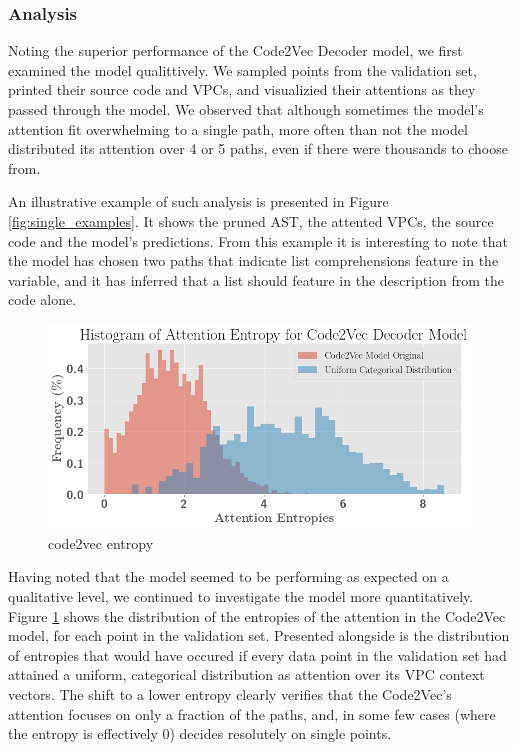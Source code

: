 \subsubsection{Analysis} %
\label{ssub:analysis}
Noting the superior performance of the Code2Vec Decoder model, we first examined the model qualittively. We sampled points from the validation set, printed their source code and VPCs, and visualizied their attentions as they passed through the model.
We observed that although sometimes the model's attention fit overwhelming to a single path, more often than not the model distributed its attention over 4 or 5 paths, even if there were thousands to choose from.

An illustrative example of such analysis is presented in Figure  \ref{fig:single_examples}. 
It shows the pruned AST, the attented VPCs, the source code and the model's predictions.
From this example it is interesting to note that the model has chosen two paths that indicate list comprehensions feature in the variable, and it has inferred that a list should feature in the description from the code alone.



\begin{figure}[h]
\begin{center}
\includegraphics[width=0.8\linewidth]{ImagesCodeRelated/code2vec_entropies.png}
\end{center}
\caption{code2vec entropy}
\label{fig:entropy_code2vec}
\end{figure}


Having noted that the model seemed to be performing as expected on a qualitative level, we continued to investigate the model more quantitatively. 
Figure \ref{fig:entropy_code2vec} shows the distribution of the entropies of the attention in the Code2Vec model, for each point in the validation set. 
Presented alongside is the distribution of entropies that would have occured if every data point in the validation set had attained a uniform, categorical distribution as attention over its VPC context vectors.
The shift to a lower entropy clearly verifies that the Code2Vec's attention focuses on only a fraction of the paths, and, in some few cases (where the entropy is effectively 0) decides resolutely on single points.


